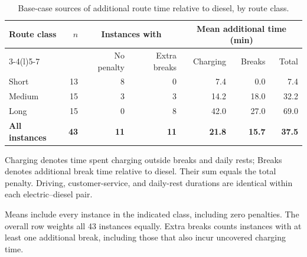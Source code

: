 \begin{table}[tbp]
    \centering
    \begin{threeparttable}
    \caption{Base-case sources of additional route time relative to diesel, by route class.}
    \label{tab:penalty_summary}
    \small
    \setlength{\tabcolsep}{4pt}
    \begin{tabular}{@{}lrrrrrr@{}}
    \toprule
    Route class & $n$ & \multicolumn{2}{c}{Instances with} & \multicolumn{3}{c}{Mean additional time (min)} \\
    \cmidrule(lr){3-4}\cmidrule(l){5-7}
     & & No penalty & Extra breaks & Charging & Breaks & Total \\
    \midrule
    Short & 13 & 8 & 0 & 7.4 & 0.0 & 7.4 \\
    Medium & 15 & 3 & 3 & 14.2 & 18.0 & 32.2 \\
    Long & 15 & 0 & 8 & 42.0 & 27.0 & 69.0 \\
    \midrule
    \textbf{All instances} & \textbf{43} & \textbf{11} & \textbf{11} & \textbf{21.8} & \textbf{15.7} & \textbf{37.5} \\
    \bottomrule
    \end{tabular}
    \begin{tablenotes}[flushleft]\footnotesize
    \item Charging denotes time spent charging outside breaks and daily rests; Breaks denotes additional break time relative to diesel. Their sum equals the total penalty. Driving, customer-service, and daily-rest durations are identical within each electric--diesel pair.
    \item Means include every instance in the indicated class, including zero penalties. The overall row weights all 43 instances equally. Extra breaks counts instances with at least one additional break, including those that also incur uncovered charging time.
    \end{tablenotes}
    \end{threeparttable}
\end{table}
